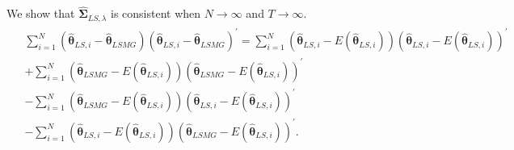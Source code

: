 \documentclass[12pt,a4paper,hyperref]{article}
\begin{document}
We show that $\hat{\boldsymbol{\Sigma}}_{LS,\lambda}$ is consistent when $N \to \infty$ and $T \to \infty.$
\begin{align}
\begin{split}
&\sum^{N}_{i=1}\left( \hat{\boldsymbol{\theta}}_{LS,i}- \hat{\boldsymbol{\theta}}_{LSMG}\right)\left( \hat{\boldsymbol{\theta}}_{LS,i}- \hat{\boldsymbol{\theta}}_{LSMG}\right)^{'}=\sum^{N}_{i=1}\left( \hat{\boldsymbol{\theta}}_{LS,i}- E\left(\hat{\boldsymbol{\theta}}_{LS, i}\right) \right)\left( \hat{\boldsymbol{\theta}}_{LS,i}- E\left(\hat{\boldsymbol{\theta}}_{LS, i}\right)\right)^{'}\\
&+\sum^{N}_{i=1}\left( \hat{\boldsymbol{\theta}}_{LSMG}- E\left(\hat{\boldsymbol{\theta}}_{LS, i}\right)\right) \left( \hat{\boldsymbol{\theta}}_{LSMG}- E\left(\hat{\boldsymbol{\theta}}_{LS, i}\right)\right)^{'}\\
&-\sum^{N}_{i=1}\left( \hat{\boldsymbol{\theta}}_{LSMG}- E\left(\hat{\boldsymbol{\theta}}_{LS, i}\right)\right) \left( \hat{\boldsymbol{\theta}}_{LS,i}- E\left(\hat{\boldsymbol{\theta}}_{LS, i}\right)\right)^{'} \\
&-\sum^{N}_{i=1}\left( \hat{\boldsymbol{\theta}}_{LS,i}- E\left(\hat{\boldsymbol{\theta}}_{LS, i}\right)\right) \left( \hat{\boldsymbol{\theta}}_{LSMG}- E\left(\hat{\boldsymbol{\theta}}_{LS, i}\right)\right)^{'}. \label{20}
\end{split}
\end{align}
\end{document}

